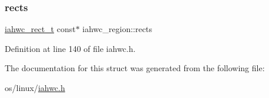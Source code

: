 \subsubsection{\texorpdfstring{rects}{rects}}
{\footnotesize\ttfamily \mbox{\hyperlink{iahwc_8h_a163ae45b2470c0d300fe4ec4d017a603}{iahwc\+\_\+rect\+\_\+t}} const$\ast$ iahwc\+\_\+region\+::rects}



Definition at line 140 of file iahwc.\+h.



The documentation for this struct was generated from the following file\+:\begin{DoxyCompactItemize}
\item 
os/linux/\mbox{\hyperlink{iahwc_8h}{iahwc.\+h}}\end{DoxyCompactItemize}
